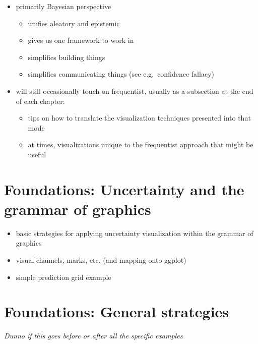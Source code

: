 \documentclass[]{book}
\providecommand{\tightlist}{%
  \setlength{\itemsep}{0pt}\setlength{\parskip}{0pt}}
\theoremstyle{definition}
\theoremstyle{definition}
\theoremstyle{definition}
\theoremstyle{remark}
\begin{document}
\begin{itemize}
\tightlist
\item
  primarily Bayesian perspective

  \begin{itemize}
  \tightlist
  \item
    unifies aleatory and epistemic
  \item
    gives us one framework to work in
  \item
    simplifies building things
  \item
    simplifies communicating things (see e.g.~confidence fallacy)
  \end{itemize}
\item
  will still occasionally touch on frequentist, usually as a subsection
  at the end of each chapter:

  \begin{itemize}
  \tightlist
  \item
    tips on how to translate the visualization techniques presented into
    that mode
  \item
    at times, visualizations unique to the frequentist approach that
    might be useful
  \end{itemize}
\end{itemize}

\hypertarget{ch-vis-foundations}{%
\chapter{Foundations: Uncertainty and the grammar of
graphics}\label{ch-vis-foundations}}

\begin{itemize}
\tightlist
\item
  basic strategies for applying uncertainty visualization within the
  grammar of graphics
\item
  visual channels, marks, etc. (and mapping onto ggplot)
\item
  simple prediction grid example
\end{itemize}

\hypertarget{ch-strategies}{%
\chapter{Foundations: General strategies}\label{ch-strategies}}

\emph{Dunno if this goes before or after all the specific examples}
\end{document}
